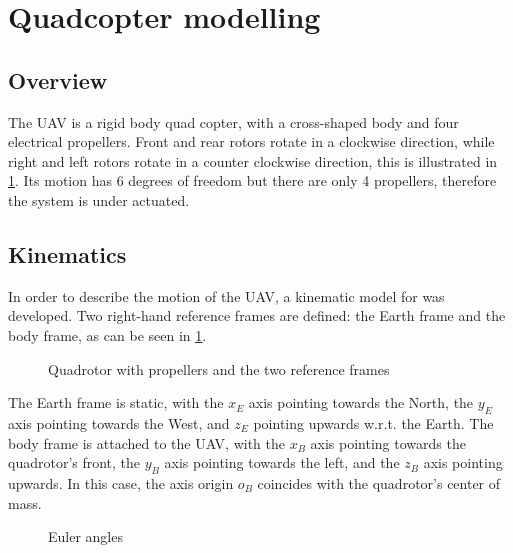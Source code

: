 \documentclass[journal]{IEEEtran}
\begin{document}
	\section{Quadcopter modelling}
	\subsection{Overview}
	
	The UAV is a rigid body quad copter, with a cross-shaped body and four electrical propellers. Front and rear rotors rotate in a clockwise direction, while right and left rotors rotate in a counter clockwise direction, this is illustrated in \figurename \ref{fig:frames_rotors}. Its motion has 6 degrees of freedom but there are only 4 propellers, therefore the system is under actuated. 
	
	\subsection{Kinematics}
	In order to describe the motion of the UAV, a kinematic model for was developed.
	Two right-hand reference frames are defined: the Earth frame and the body frame, as can be seen in \figurename{\ref{fig:frames_rotors}}. 
	
	\begin{figure}[h]
		\centering
		
		\caption{Quadrotor with propellers and the two reference frames}
		\label{fig:frames_rotors}
	\end{figure}
	
	The Earth frame is static, with the $x_E$ axis pointing towards the North, the $y_E$ axis pointing towards the West, and $z_E$ pointing upwards w.r.t. the Earth. The body frame is attached to the UAV, with the $x_B$ axis pointing towards the quadrotor's front, the $y_B$ axis pointing towards the left, and the $z_B$ axis pointing upwards. In this case, the axis origin $o_B$ coincides with the quadrotor's center of mass.
	
	\begin{figure}[h]
		\centering
		
		
		
		\caption{Euler angles}
		\label{fig:roll_pitch_yaw}
	\end{figure}
	
\end{document}
